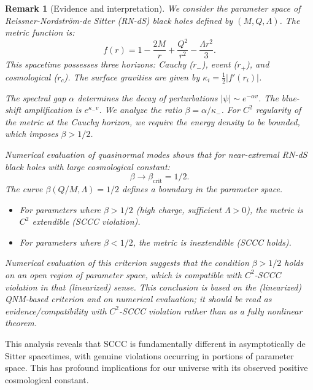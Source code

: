 \documentclass[12pt,a4paper]{article}
\newtheorem{remark}[theorem]{Remark}
\begin{document}
\begin{remark}[Evidence and interpretation]
We consider the parameter space of Reissner-Nordström-de Sitter (RN-dS) black holes defined by $(M, Q, \Lambda)$. The metric function is:
\begin{equation}
f(r) = 1 - \frac{2M}{r} + \frac{Q^2}{r^2} - \frac{\Lambda r^2}{3}.
\end{equation}
This spacetime possesses three horizons: Cauchy ($r_-$), event ($r_+$), and cosmological ($r_c$). 
The surface gravities are given by $\kappa_i = \frac{1}{2} |f'(r_i)|$.

The spectral gap $\alpha$ determines the decay of perturbations $|\psi| \sim e^{-\alpha v}$. The blue-shift amplification is $e^{\kappa_- v}$.
We analyze the ratio $\beta = \alpha / \kappa_-$.
For $C^2$ regularity of the metric at the Cauchy horizon, we require the energy density to be bounded, which imposes $\beta > 1/2$.

Numerical evaluation of quasinormal modes shows that for near-extremal RN-dS black holes with large cosmological constant:
\begin{equation}
\beta \to \beta_{\text{crit}} = 1/2.
\end{equation}
The curve $\beta(Q/M, \Lambda) = 1/2$ defines a boundary in the parameter space.
\begin{itemize}
    \item For parameters where $\beta > 1/2$ (high charge, sufficient $\Lambda > 0$), the metric is $C^2$ extendible (SCCC violation).
    \item For parameters where $\beta < 1/2$, the metric is inextendible (SCCC holds).
\end{itemize}
Numerical evaluation of this criterion suggests that the condition $\beta > 1/2$ holds on an open region of parameter space, which is compatible with $C^2$-SCCC violation in that (linearized) sense.
This conclusion is based on the (linearized) QNM-based criterion and on numerical evaluation; it should be read as evidence/compatibility with $C^2$-SCCC violation rather than as a fully nonlinear theorem.
\end{remark}

This analysis reveals that SCCC is fundamentally different in asymptotically de Sitter spacetimes, with genuine violations occurring in portions of parameter space. This has profound implications for our universe with its observed positive cosmological constant.




\end{document}
